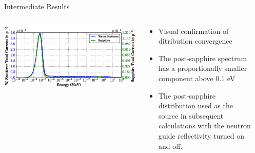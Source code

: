 \documentclass[final,t]{beamer}
\begin{document}
\begin{frame}{}
\begin{columns}[t]
\begin{column}{.3\linewidth}
\begin{block}{Intermediate Results}
      \begin{columns}

      \begin{column}{0.5\linewidth}

       

        \includegraphics*[width=\linewidth]{specs_narrow.eps}

      \end{column}

      \begin{column}{0.5\linewidth}

      \begin{itemize}
        \item Visual confirmation of ditribution convergence
        \item The post-sapphire spectrum has a proportionally smaller component above 0.1 eV
        \item The post-sapphire distribution used as the source in subsequent calculations with the neutron guide reflectivity turned on and off. 
        \end{itemize}

      \end{column}

      \end{columns}

      \end{block}



    \end{column}

    
    \begin{column}{.3\linewidth}


\end{column}
\end{columns}
\end{frame}
\end{document}
